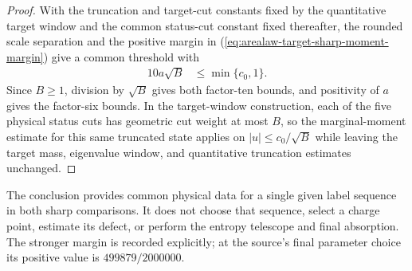 \begin{proof}
    \leanok
    With the truncation and target-cut constants fixed by the quantitative
    target window and the common status-cut constant fixed thereafter, the rounded
    scale separation and the positive margin in
    (\ref{eq:arealaw-target-sharp-moment-margin}) give a common threshold
    with
    \begin{align}
        10a\sqrt B & \leq\min\{c_0,1\}.
        \label{eq:arealaw-target-sharp-product-smallness}
    \end{align}
    Since $B\geq1$, division by $\sqrt B$ gives both factor-ten bounds, and
    positivity of $a$ gives the factor-six bounds.
    In the target-window construction, each of the five physical
    status cuts has geometric cut weight at most $B$, so the marginal-moment
    estimate for this same truncated state applies on
    $|u|\leq c_0/\sqrt B$ while leaving the target mass, eigenvalue window, and
    quantitative truncation estimates unchanged.
\end{proof}

The conclusion provides common physical data for a single given label
sequence in both sharp comparisons.  It does not choose that sequence,
select a charge point, estimate its defect, or perform the entropy
telescope and final absorption.  The stronger margin is recorded explicitly;
at the source's final parameter choice its positive value is
$499879/2000000$.
